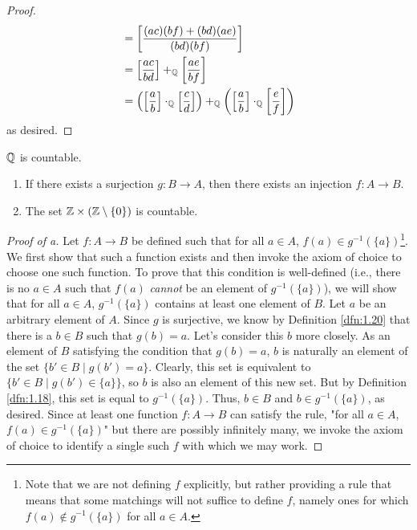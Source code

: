 \documentclass[../main.tex]{subfiles}
\begin{document}
\begin{theorem}
\begin{enumerate}[label={\alph*\textup{)}},ref={\thetheorem\alph*}]
\begin{proof}
\begin{align*}
                &= \left[ \frac{(ac)(bf)+(bd)(ae)}{(bd)(bf)} \right]\\
                &= \left[ \frac{ac}{bd} \right]+_{\mathbb{Q}}\left[ \frac{ae}{bf} \right]\\
                &= \left( \left[ \frac{a}{b} \right]\cdot_{\mathbb{Q}}\left[ \frac{c}{d} \right] \right)+_{\mathbb{Q}}\left( \left[ \frac{a}{b} \right]\cdot_{\mathbb{Q}}\left[ \frac{e}{f} \right] \right)
            \end{align*}
            as desired.
        \end{proof}
    \end{enumerate}
\end{theorem}

\begin{theorem}\label{trm:2.11}
    $\mathbb{Q}$ is countable.
    \begin{lemma*}\leavevmode
        \begin{enumerate}[label={\alph*\textup{)}}]
            \item If there exists a surjection $g:B\to A$, then there exists an injection $f:A\to B$.
            \item The set $\mathbb{Z}\times(\mathbb{Z}\setminus\{0\})$ is countable.
        \end{enumerate}
        \begin{proof}[Proof of a]
            Let $f:A\to B$ be defined such that for all $a\in A$, $f(a)\in g^{-1}(\{a\})$\footnote{Note that we are not defining $f$ explicitly, but rather providing a rule that means that some matchings will not suffice to define $f$, namely ones for which $f(a)\notin g^{-1}(\{a\})$ for all $a\in A$.}. We first show that such a function exists and then invoke the axiom of choice to choose one such function. To prove that this condition is well-defined (i.e., there is no $a\in A$ such that $f(a)$ \emph{cannot} be an element of $g^{-1}(\{a\})$), we will show that for all $a\in A$, $g^{-1}(\{a\})$ contains at least one element of $B$. Let $a$ be an arbitrary element of $A$. Since $g$ is surjective, we know by Definition \ref{dfn:1.20} that there is a $b\in B$ such that $g(b)=a$. Let's consider this $b$ more closely. As an element of $B$ satisfying the condition that $g(b)=a$, $b$ is naturally an element of the set $\{b'\in B\mid g(b')=a\}$. Clearly, this set is equivalent to $\{b'\in B\mid g(b')\in\{a\}\}$, so $b$ is also an element of this new set. But by Definition \ref{dfn:1.18}, this set is equal to $g^{-1}(\{a\})$. Thus, $b\in B$ and $b\in g^{-1}(\{a\})$, as desired. Since at least one function $f:A\to B$ can satisfy the rule, "for all $a\in A$, $f(a)\in g^{-1}(\{a\})$" but there are possibly infinitely many, we invoke the axiom of choice to identify a single such $f$ with which we may work.\par

\end{proof}
\end{lemma*}
\end{theorem}
\end{document}
